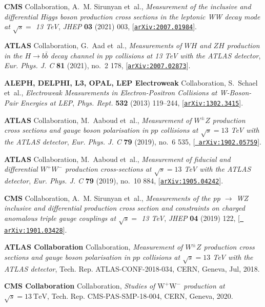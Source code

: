 \documentclass[11pt,a4paper]{article}
\numberwithin{equation}{section}
\numberwithin{figure}{section}
\numberwithin{table}{section}
\begin{document}
\begin{thebibliography}{100}
{\bf CMS} Collaboration, A.~M. Sirunyan et~al., {\it {Measurement of the
  inclusive and differential Higgs boson production cross sections in the
  leptonic WW decay mode at $\sqrt{s} =$ 13 TeV}},  {\em JHEP} {\bf 03} (2021)
  003, [\href{http://arxiv.org/abs/2007.01984}{{\tt arXiv:2007.01984}}].

{\bf ATLAS} Collaboration, G.~Aad et~al., {\it {Measurements of $WH$ and $ZH$
  production in the $H \rightarrow b\bar{b}$ decay channel in $pp$ collisions
  at 13 TeV with the ATLAS detector}},  {\em Eur. Phys. J. C} {\bf 81} (2021),
  no.~2 178, [\href{http://arxiv.org/abs/2007.02873}{{\tt arXiv:2007.02873}}].

{\bf ALEPH, DELPHI, L3, OPAL, LEP Electroweak} Collaboration, S.~Schael et~al.,
  {\it {Electroweak Measurements in Electron-Positron Collisions at
  W-Boson-Pair Energies at LEP}},  {\em Phys. Rept.} {\bf 532} (2013) 119--244,
  [\href{http://arxiv.org/abs/1302.3415}{{\tt arXiv:1302.3415}}].

{\bf ATLAS} Collaboration, M.~Aaboud et~al., {\it {Measurement of $W^{\pm}Z$
  production cross sections and gauge boson polarisation in $pp$ collisions at
  $\sqrt{s} = 13$ TeV with the ATLAS detector}},  {\em Eur. Phys. J. C} {\bf
  79} (2019), no.~6 535, [\href{http://arxiv.org/abs/1902.05759}{{\tt
  arXiv:1902.05759}}].

{\bf ATLAS} Collaboration, M.~Aaboud et~al., {\it {Measurement of fiducial and
  differential $W^+W^-$ production cross-sections at $\sqrt{s}=13$ TeV with the
  ATLAS detector}},  {\em Eur. Phys. J. C} {\bf 79} (2019), no.~10 884,
  [\href{http://arxiv.org/abs/1905.04242}{{\tt arXiv:1905.04242}}].

{\bf CMS} Collaboration, A.~M. Sirunyan et~al., {\it {Measurements of the pp
  $\to$ WZ inclusive and differential production cross section and constraints
  on charged anomalous triple gauge couplings at $\sqrt{s} =$ 13 TeV}},  {\em
  JHEP} {\bf 04} (2019) 122, [\href{http://arxiv.org/abs/1901.03428}{{\tt
  arXiv:1901.03428}}].

{\bf ATLAS Collaboration} Collaboration, {\it {Measurement of $W^{\pm}Z$
  production cross sections and gauge boson polarisation in $pp$ collisions at
  $\sqrt{s} = 13$ TeV with the ATLAS detector}},  Tech. Rep.
  ATLAS-CONF-2018-034, CERN, Geneva, Jul, 2018.

{\bf CMS Collaboration} Collaboration, {\it {Studies of $\mathrm{W^+W^-}$
  production at $\sqrt{s}=13~\mathrm{TeV}$}},  Tech. Rep. CMS-PAS-SMP-18-004,
  CERN, Geneva, 2020.


\end{thebibliography}
\end{document}
